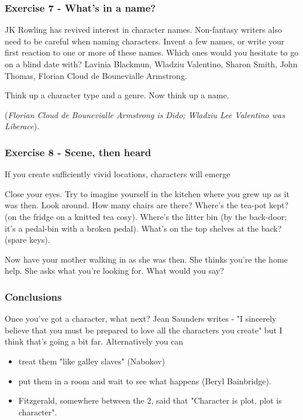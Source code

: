\documentclass[11pt]{article}
\newenvironment{narrow}[2]{%
 \begin{list}{}{%
  \setlength{\topsep}{0pt}%
  \setlength{\leftmargin}{#1}%
  \setlength{\rightmargin}{#2}%
  \setlength{\listparindent}{\parindent}%
  \setlength{\itemindent}{\parindent}%
  \setlength{\parsep}{\parskip}%
 }%
\item[]}{\end{list}}
\begin{document}
\subsubsection*{Exercise 7 - What's in a name?}
JK Rowling has revived interest in character names. Non-fantasy writers also need to be careful when naming characters. Invent a few names, or write your first reaction to one or more of these names. Which ones would you hesitate to go on a blind date with? Lavinia Blackmun,  Wladziu Valentino, Sharon Smith,  John Thomas, Florian Cloud de Bounevialle Armstrong. 


\begin{narrow}{1.0cm}{1.0cm}
Think up a character type and a genre. Now think up a name. 
\end{narrow}

(\textit{Florian Cloud de Bounevialle Armstrong is Dido; Wladziu Lee Valentino was Liberace}).




\subsubsection*{Exercise 8 - Scene, then heard}
If you create sufficiently vivid locations, characters will emerge


\begin{narrow}{1.0cm}{1.0cm}

Close your eyes.
Try to imagine yourself in the kitchen where you grew up as it was then. Look 
around. How many chairs are there? Where's the tea-pot kept? (on the fridge 
on a knitted tea cosy). Where's the litter bin (by the back-door; it's a 
pedal-bin with a broken pedal). What's on the top shelves at the back? (spare keys).


Now have your mother walking in as she was then. She thinks you're the home
 help. She asks what you're looking for. What would you say?
\end{narrow}

\subsubsection*{Conclusions}
Once you've got a character, what next?
Jean Saunders writes - "I sincerely believe that you must be prepared to love all the characters
you create" but I think that's going a bit far. Alternatively you can


\begin{itemize} 
\item  treat them "like galley slaves" (Nabokov) 
\item  put them in a room and wait to see what happens (Beryl Bainbridge).
\item  Fitzgerald, somewhere between the 2, said that "Character is plot, plot is character".
\end{itemize}
\end{document}
